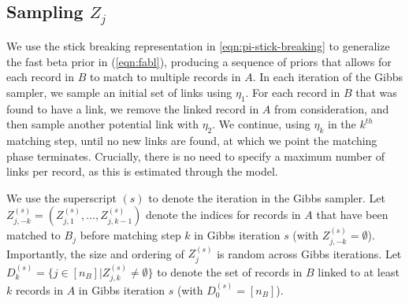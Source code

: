 \documentclass[12pt,letterpaper]{article}
\newcommand{\1}[1]{\mathbb{I}\!\left[#1\right]} %
\def \brian#1{{\color{red} (#1)}}
\begin{document}

\subsection{Sampling $Z_j$} \label{sec:sequential-sampler} 

We use the stick breaking representation in \eqref{eqn:pi-stick-breaking} to generalize the fast beta prior in (\ref{eqn:fabl}), producing a sequence of priors that allows for each record in $B$ to match to multiple records in $A$. In each iteration of the Gibbs sampler, we sample an initial set of links using $\eta_1$. For each record in $B$ that was found to have a link, we remove the linked record in $A$ from consideration, and then sample another potential link with $\eta_2$. We continue, using $\eta_k$ in the $k^{th}$ matching step, until no new links are found, at which we point the matching phase terminates. Crucially, there is no need to specify a maximum number of links per record, as this is estimated through the model. 


We use the superscript $(s)$ to denote the iteration in the Gibbs sampler. Let $Z_{j, -k}^{(s)} = (Z_{j, 1}^{(s)}, \ldots, Z_{j, k-1}^{(s)})$ denote the indices for records in $A$ that have been matched to $B_j$ before matching step $k$ in Gibbs iteration $s$ (with $Z_{j, -k}^{(s)} = \emptyset$). Importantly, the size and ordering of $Z_j^{(s)}$ is random across Gibbs iterations. Let $D_k^{(s)} = \{j \in [n_B]| Z_{j, k}^{(s)} \neq \emptyset\}$ to denote the set of records in $B$ linked to at least $k$ records in $A$ in Gibbs iteration $s$ (with $D_0^{(s)} = [n_B]$).  
\end{document}
